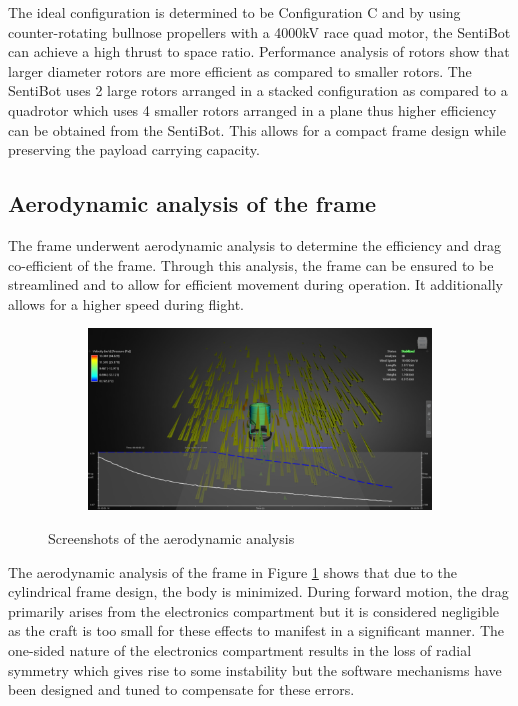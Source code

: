 \documentclass[12pt]{article}
\begin{document}
The ideal configuration is determined to be Configuration C and by using counter-rotating bullnose propellers with a 4000kV race quad motor, the SentiBot can achieve a high thrust to space ratio. Performance analysis of rotors show that larger diameter rotors are more efficient as compared to smaller rotors\cite{propellor}. The SentiBot uses 2 large rotors arranged in a stacked configuration as compared to a quadrotor which uses 4 smaller rotors arranged in a plane thus higher efficiency can be obtained from the SentiBot\cite{propellor}. This allows for a compact frame design while preserving the payload carrying capacity.

\subsection{Aerodynamic analysis of the frame}
The frame underwent aerodynamic analysis to determine the efficiency and drag co-efficient of the frame. Through this analysis, the frame can be ensured to be streamlined and to allow for efficient movement during operation. It additionally allows for a higher speed during flight.

\begin{figure}[h]
	\centering
	\begin{subfigure}{0.5\textwidth}
		\centering
		\includegraphics[width=0.9\linewidth]{aerodynamic-1.png}
	\end{subfigure}
	\caption{Screenshots of the aerodynamic analysis}
	\label{fig:aerodynamic}
\end{figure}

The aerodynamic analysis of the frame in Figure \ref{fig:aerodynamic} shows that due to the cylindrical frame design, the body is minimized. During forward motion, the drag primarily arises from the electronics compartment but it is considered negligible as the craft is too small for these effects to manifest in a significant manner. The one-sided nature of the electronics compartment results in the loss of radial symmetry which gives rise to some instability but the software mechanisms have been designed and tuned to compensate for these errors. 
\end{document}
